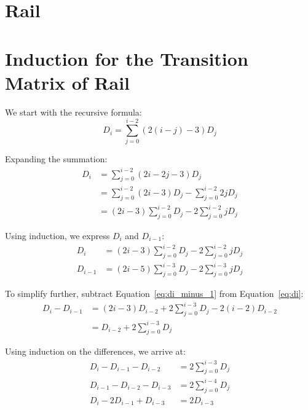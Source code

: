 \section{Rail}
\label{rail}


\section{Induction for the Transition Matrix of Rail}
\label{induction for Rail}

We start with the recursive formula:
\begin{equation}
    D_i = \sum\limits_{j = 0}^{i - 2}(2(i - j) - 3)D_j
\end{equation}

Expanding the summation:
\begin{align*}
    D_i &= \sum\limits_{j = 0}^{i - 2}(2i - 2j - 3)D_j \\
        &= \sum\limits_{j = 0}^{i - 2}(2i - 3)D_j - \sum\limits_{j = 0}^{i - 2}2jD_j \\
        &= (2i - 3)\sum\limits_{j = 0}^{i - 2}D_j - 2\sum\limits_{j = 0}^{i - 2}jD_j
\end{align*}

Using induction, we express $D_i$ and $D_{i - 1}$:
\begin{align}
    D_i &= (2i - 3)\sum\limits_{j = 0}^{i - 2}D_j - 2\sum\limits_{j = 0}^{i - 2}jD_j \label{eq:di} \\
    D_{i - 1} &= (2i - 5)\sum\limits_{j = 0}^{i - 3}D_j - 2\sum\limits_{j = 0}^{i - 3}jD_j \label{eq:di_minus_1}
\end{align}

To simplify further, subtract Equation~\eqref{eq:di_minus_1} from Equation~\eqref{eq:di}:
\begin{align*}
    D_i - D_{i - 1} &= (2i - 3)D_{i - 2} + 2 \sum\limits_{j = 0}^{i - 3}D_j - 2(i - 2)D_{i - 2} \\
                    &= D_{i - 2} + 2\sum\limits_{j = 0}^{i - 3}D_j
\end{align*}

Using induction on the differences, we arrive at:
\begin{align*}
    D_i - D_{i - 1} - D_{i - 2} &= 2\sum\limits_{j = 0}^{i - 3}D_j \\
    D_{i - 1} - D_{i - 2} - D_{i - 3} &= 2\sum\limits_{j = 0}^{i - 4}D_j \\
    D_i - 2D_{i - 1} + D_{i - 3} &= 2D_{i - 3}
\end{align*}

